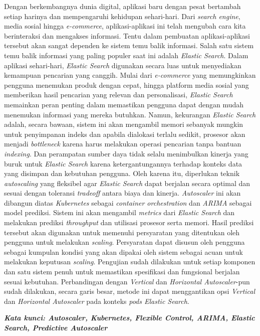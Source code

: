 \begin{singlespace}
    Dengan berkembangnya dunia digital, aplikasi baru dengan pesat bertambah setiap harinya dan mempengaruhi kehidupan sehari-hari. Dari \textit{search engine}, media sosial hingga \textit{e-commerce}, aplikasi-aplikasi ini telah mengubah cara kita berinteraksi dan mengakses informasi. Tentu dalam pembuatan aplikasi-aplikasi tersebut akan sangat dependen ke sistem temu balik informasi. Salah satu sistem temu balik informasi yang paling populer saat ini adalah \textit{Elastic Search}. Dalam aplikasi sehari-hari, \textit{Elastic Search} digunakan secara luas untuk menyediakan kemampuan pencarian yang canggih. Mulai dari \textit{e-commerce} yang memungkinkan pengguna menemukan produk dengan cepat, hingga platform media sosial yang memberikan hasil pencarian yang relevan dan personalisasi, \textit{Elastic Search} memainkan peran penting dalam memastikan pengguna dapat dengan mudah menemukan informasi yang mereka butuhkan. Namun, kekurangan \textit{Elastic Search} adalah, secara bawaan, sistem ini akan mengambil memori sebanyak mungkin untuk penyimpanan indeks dan apabila dialokasi terlalu sedikit, prosesor akan menjadi \textit{bottleneck} karena harus melakukan operasi pencarian tanpa bantuan \textit{indexing}. Dan perampatan sumber daya tidak selalu menimbulkan kinerja yang buruk untuk \textit{Elastic Search} karena ketergantungannya terhadap konteks data yang disimpan dan kebutuhan pengguna. Oleh karena itu, diperlukan teknik \textit{autoscaling} yang fleksibel agar \textit{Elastic Search} dapat berjalan secara optimal dan sesuai dengan toleransi \textit{tradeoff} antara biaya dan kinerja. \textit{Autoscaler} ini akan dibangun diatas \textit{Kubernetes} sebagai \textit{container orchestration} dan \textit{ARIMA} sebagai model prediksi. Sistem ini akan mengambil \textit{metrics} dari \textit{Elastic Search} dan melakukan prediksi \textit{throughput} dan utilisasi prosesor serta memori. Hasil prediksi tersebut akan digunakan untuk memenuhi persyaratan yang ditentukan oleh pengguna untuk melakukan \textit{scaling}. Persyaratan dapat disusun oleh pengguna sebagai kumpulan kondisi yang akan dipakai oleh sistem sebagai acuan untuk melakukan keputusan \textit{scaling}. Pengujian sudah dilakukan untuk setiap komponen dan satu sistem penuh untuk memastikan spesifikasi dan fungsional berjalan sesuai kebutuhan. Perbandingan dengan \textit{Vertical} dan \textit{Horizontal Autoscaler}-pun sudah dilakukan, secara garis besar, metode ini dapat menggantikan opsi \textit{Vertical} dan \textit{Horizontal Autoscaler} pada konteks \textit{pods Elastic Search}.

    \normalsize
    \textbf{\textit{Kata kunci: Autoscaler, Kubernetes, Flexible Control, ARIMA, Elastic Search, Predictive Autoscaler}}
\end{singlespace}
\clearpage